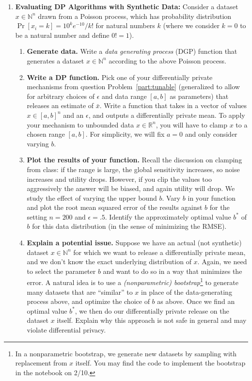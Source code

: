 \documentclass[11pt]{article}
\theoremstyle{plain}
\theoremstyle{definition}
\theoremstyle{solution}
\begin{document}
\begin{enumerate}[leftmargin=*]
        \newpage
        \item \textbf{Evaluating DP Algorithms with Synthetic Data:}
        \label{prob:Poisson}
        Consider a dataset $x\in \mathbb{N}^n$ drawn from a Poisson process, which has probability distribution  $\Pr[x_i=k] = 10^ke^{-10}/k!$ for  natural numbers $k$ (where we consider $k=0$ to be a natural number and define $0!=1$).
        \begin{enumerate}
            \item \textbf{Generate data.} Write a \emph{data generating process} (DGP) function that generates a dataset $x\in \mathbb{N}^n$ according to the above Poisson process.
            \item
            \textbf{Write a DP function.}
            Pick one of your differentially private mechanisms from question Problem~\ref{part:tunable} (generalized
            to allow for arbitrary choices of $\epsilon$ and data range $[a,b]$ as parameters) that releases an estimate of $\bar{x}$. Write a function that takes in a vector of values $x\in [a,b]^n$ and an $\epsilon$, and outputs a differentially private mean.  To apply your mechanism to unbounded data $x\in \mathbb{R}^n$, you will have to clamp $x$ to
            a chosen range $[a,b]$.    For simplicity,
            we will fix $a=0$ and only consider varying $b$.
            \item
            \textbf{Plot the results of your function.} Recall the discussion on clamping from class: if the range is large, the global sensitivity increases,  so noise increases and utility drops.  However, if you clip the values too aggressively the answer will be biased, and again utility will drop. We study the effect of varying the upper bound $b$. Vary $b$ in your function and plot the root mean squared error of the results against $b$ for the setting $n=200$
            and $\epsilon=.5$.
            Identify the approximately optimal value $b^*$ of $b$
            for this data distribution (in the sense of minimizing the RMSE).
            \item
            \textbf{Explain a potential issue.} Suppose we have an actual (not synthetic) dataset
            $x\in \mathbb{N}^n$ for which we want to
            release a differentially private mean,
            and we don't know the exact underlying distribution
            of $x$.
            Again, we need to select the parameter $b$ and
            want to do so in a way that minimizes the
            error.   A natural idea is to use a {\em (nonparametric) bootstrap}\footnote{In a nonparametric bootstrap, we
            generate new datasets
            by sampling with replacement from $x$ itself. You may find the code to implement the bootstrap in the notebook on 2/10.}
            to generate many datasets that are ``similar'' to $x$
            in place of the data-generating process above, and optimize the choice of $b$ as above.
            Once we find an optimal value $b^*$, we then
            do our differentially private release on the
            dataset $x$ itself.
            Explain why this approach is not safe in general and may violate differential privacy.


\end{enumerate}
\end{enumerate}
\end{document}
